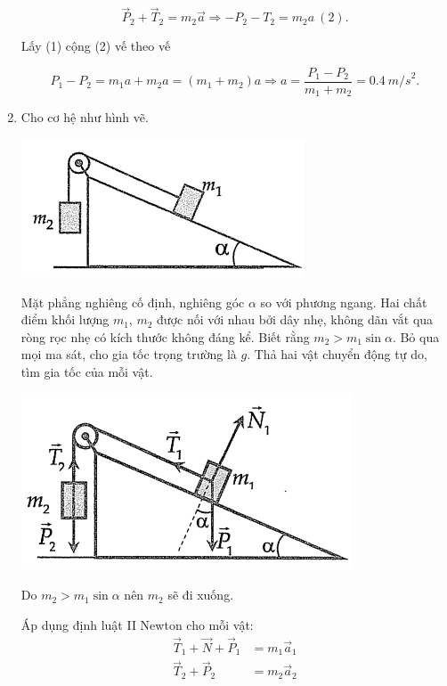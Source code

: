 \begin{enumerate}[label=\bfseries Bài \arabic*:,leftmargin=1.5cm]
{	$$\vec P_2 + \vec T_2 = m_2 \vec a \Rightarrow - P_2 - T_2 = m_2a\ (2).$$
	
	Lấy (1) cộng (2) vế theo vế
	
	$$ P_1 - P_2 = m_1 a + m_2 a = (m_1+ m_2)a \Rightarrow a = \dfrac{P_1 - P_2}{m_1 + m_2} = \SI{0,4}{m/s}^2.$$
	
}


\item {}


{Cho cơ hệ như hình vẽ.
	\begin{center}
		\includegraphics[scale=0.8]{../figs/VN10-2021-PH-TP012-3.png}
	\end{center}
	Mặt phẳng nghiêng cố định, nghiêng góc $\alpha$ so với phương ngang. Hai chất điểm khối lượng $m_1$, $m_2$ được nối với nhau bởi dây nhẹ, không dãn vắt qua ròng rọc nhẹ có kích thước không đáng kể. Biết rằng $m_2 > m_1 \sin \alpha$. Bỏ qua mọi ma sát, cho gia tốc trọng trường là $g$. Thả hai vật chuyển động tự do, tìm gia tốc của mỗi vật.
}

\hideall
{	\begin{center}
		\includegraphics[scale=0.8]{../figs/VN10-2021-PH-TP012-4.png}
	\end{center}
	
	Do $m_2 > m_1 \sin \alpha$ nên $m_2$ sẽ đi xuống.
	
	Áp dụng định luật II Newton cho mỗi vật:
	\begin{align*}
		\vec T_1 + \vec N + \vec P_1 &= m_1 \vec a_1 \\
		\vec T_2 + \vec P_2 &= m_2 \vec a_2
	\end{align*}
	
}
\end{enumerate}

